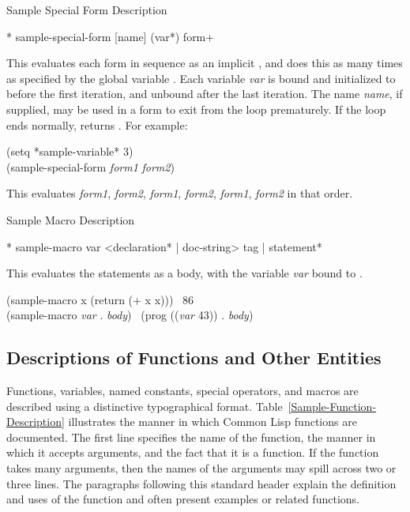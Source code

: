 \begin{table}[t]
\caption{Sample Special Form Description}
\label{Sample-Special-Form-Description}
\begin{defspec}*
sample-special-form [name] ({var}*) {form}+

This evaluates each form in sequence as an implicit , and does this
as many times as specified by
the global variable .  Each variable \emph{var} is bound
and initialized to  before the first iteration, and unbound after
the last iteration.
The name \emph{name}, if supplied, may be used in a  form
to exit from the loop prematurely.  If the loop ends normally,
 returns {\nil}.
For example:
\begin{lisp}
(setq *sample-variable* 3) \\
(sample-special-form {\emptylist} \emph{form1} \emph{form2})
\end{lisp}
This evaluates \emph{form1}, \emph{form2}, \emph{form1}, \emph{form2}, \emph{form1}, \emph{form2}
in that order.
\end{defspec}
\caption{Sample Macro Description}
\label{Sample-Macro-Description}
\begin{defmac}*
sample-macro var <declaration* | doc-string> {tag | statement}*

This evaluates the statements as a  body,
with the variable \emph{var} bound to .
\begin{lisp}
(sample-macro x (return (+ x x))) \EV\ 86 \\
(sample-macro \emph{var} . \emph{body}) \EX\ (prog ((\emph{var} 43)) . \emph{body})
\end{lisp}
\end{defmac}
\end{table}

\subsection{Descriptions of Functions and Other Entities}
\label{FUNCTION-HEADER-NOTATION-SECTION}

Functions, variables, named constants, special operators, and macros are described
using a distinctive typographical format.
Table~\ref{Sample-Function-Description} illustrates the manner
in which Common Lisp functions are documented.
The first line specifies the name of the function,
the manner in which it accepts arguments,
and the fact that it is a function.
If the function takes many arguments, then the names of the arguments
may spill across two or three lines.
The paragraphs following this standard header
explain the definition and uses of the function and often
present examples or related functions.

